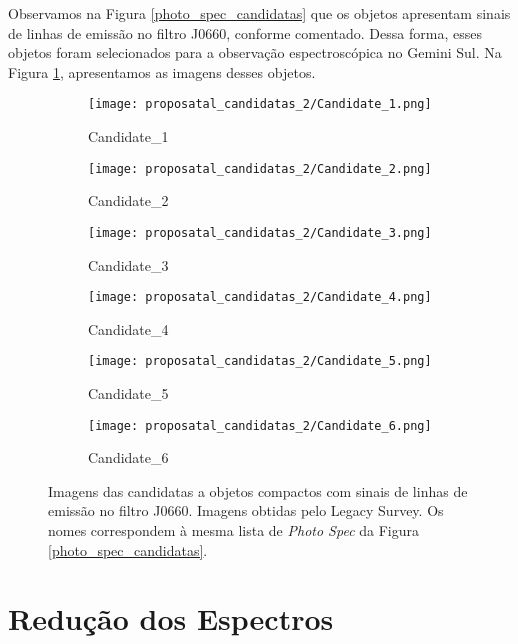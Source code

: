 Observamos na Figura \ref{photo_spec_candidatas} que os objetos apresentam sinais de linhas de emissão no filtro J0660, conforme comentado. Dessa forma, esses objetos foram selecionados para a observação espectroscópica no Gemini Sul. Na Figura \ref{candidatas_espectroscopia_2_img}, apresentamos as imagens desses objetos.

\begin{figure}[!ht]
    \centering
    \captionsetup{justification=centering}
    \begin{subfigure}[b]{0.25\textwidth}
        \texttt{[image: proposatal\_candidatas\_2/Candidate\_1.png]}
        \caption{Candidate\_1}
    \end{subfigure}
    \begin{subfigure}[b]{0.25\textwidth}
        \texttt{[image: proposatal\_candidatas\_2/Candidate\_2.png]}
        \caption{Candidate\_2}
    \end{subfigure}
    \begin{subfigure}[b]{0.25\textwidth}
        \texttt{[image: proposatal\_candidatas\_2/Candidate\_3.png]}
        \caption{Candidate\_3}
    \end{subfigure}
    \begin{subfigure}[b]{0.25\textwidth}
        \texttt{[image: proposatal\_candidatas\_2/Candidate\_4.png]}
        \caption{Candidate\_4}
    \end{subfigure}
    \begin{subfigure}[b]{0.25\textwidth}
        \texttt{[image: proposatal\_candidatas\_2/Candidate\_5.png]}
        \caption{Candidate\_5}
    \end{subfigure}
    \begin{subfigure}[b]{0.25\textwidth}
        \texttt{[image: proposatal\_candidatas\_2/Candidate\_6.png]}
        \caption{Candidate\_6}
    \end{subfigure}
    \caption{Imagens das candidatas a objetos compactos com sinais de linhas de emissão no filtro J0660. Imagens obtidas pelo Legacy Survey. Os nomes correspondem à mesma lista de \textit{Photo Spec} da Figura \ref{photo_spec_candidatas}.}
    \label{candidatas_espectroscopia_2_img}
\end{figure}

\section{Redução dos Espectros}\label{sec:reducao_espectros}

